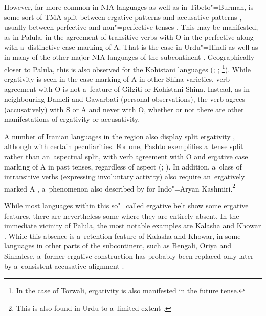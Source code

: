 However, far more common in NIA languages as well as in Tibeto"=Burman, is some sort of TMA split between ergative patterns and accusative patterns \citep[248]{masica2001}, usually between perfective and non"=perfective tenses \citep[342--343]{masica1991}. This may be manifested, as in Palula, in the agreement of transitive verbs with O in the perfective along with a~distinctive case marking of A. That is the case in Urdu"=Hindi \citep[124]{schmidt1999} as well as in many of the other major NIA languages of the subcontinent \citep[248]{masica2001}. Geographically closer to Palula, this is also observed for the Kohistani languages (\citealt[136]{baart1999a}; \citealt[34]{hallberghallberg1999}; \citealt[93--95]{lunsford2001}\footnote{In the case of Torwali, ergativity is also manifested in the future tense.}). While ergativity is seen in the case marking of A in other Shina varieties, verb agreement with O is not a~feature of Gilgiti or Kohistani Shina. Instead, as in neighbouring Dameli and Gawarbati (personal observations), the verb agrees (accusatively) with S or A and never with O, whether or not there are other manifestations of ergativity or accusativity.



A number of Iranian languages in the region also display split ergativity \citep{payne1980}, although with certain peculiarities. For one, Pashto exemplifies a~tense split rather than an~aspectual split, with verb agreement with O and ergative case marking of A in past tenses, regardless of aspect (\citealt[4--5]{tegey1977}; \citealt[71--72]{lorenz1979}). In addition, a~class of intransitive verbs (expressing involuntary activity) also require an~ergatively marked A \citep[112]{babrakzai1999}, a~phenomenon also described by \citet[217]{hookkoul2004} for Indo"=Aryan Kashmiri.\footnote{This is also found in Urdu to a~limited extent \citep[168]{schmidt1999}.} 



While most languages within this so"=called ergative belt show some ergative features, there are nevertheless some where they are entirely absent. In the immediate vicinity of Palula, the most notable examples are Kalasha and Khowar \citep[41]{bashir1988}. While this absence is a~retention feature of Kalasha and Khowar, in some languages in other parts of the subcontinent, such as Bengali, Oriya and Sinhalese, a~former ergative construction has probably been replaced only later by a~consistent accusative alignment \citep[343--344]{masica1991}.



